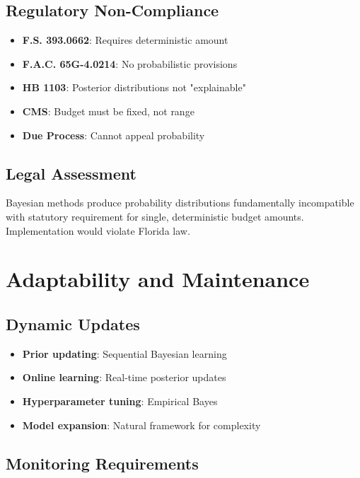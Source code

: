 \subsection{Regulatory Non-Compliance}

\begin{itemize}
    \item[\redcross] \textbf{F.S. 393.0662}: Requires deterministic amount
    \item[\redcross] \textbf{F.A.C. 65G-4.0214}: No probabilistic provisions
    \item[\redcross] \textbf{HB 1103}: Posterior distributions not "explainable"
    \item[\redcross] \textbf{CMS}: Budget must be fixed, not range
    \item[\redcross] \textbf{Due Process}: Cannot appeal probability
\end{itemize}

\subsection{Legal Assessment}

Bayesian methods produce probability distributions fundamentally incompatible with statutory requirement for single, deterministic budget amounts. Implementation would violate Florida law.

\section{Adaptability and Maintenance}

\subsection{Dynamic Updates}

\begin{itemize}
    \item \textbf{Prior updating}: Sequential Bayesian learning
    \item \textbf{Online learning}: Real-time posterior updates
    \item \textbf{Hyperparameter tuning}: Empirical Bayes
    \item \textbf{Model expansion}: Natural framework for complexity
\end{itemize}

\subsection{Monitoring Requirements}

